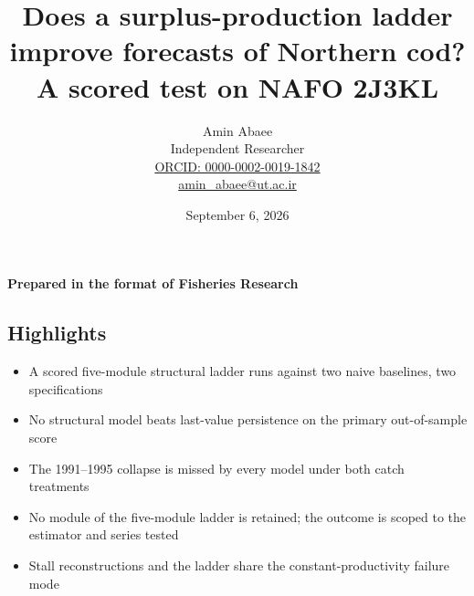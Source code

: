 \documentclass[11pt]{article}
\providecommand{\tightlist}{\setlength{\itemsep}{0pt}\setlength{\parskip}{0pt}}
\begin{document}
\title{Does a surplus-production ladder improve forecasts of Northern cod? A scored test on NAFO 2J3KL}
\author{Amin Abaee\\[0.35em]
{\small Independent Researcher}\\[0.55em]
{\small\href{https://orcid.org/0000-0002-0019-1842}{ORCID: 0000-0002-0019-1842}}\\[0.3em]
{\small\href{mailto:amin\_abaee@ut.ac.ir}{amin\_abaee@ut.ac.ir}}}
\date{September 6, 2026}
\maketitle

{\centering\small \textbf{Prepared in the format of Fisheries Research}\par}

\subsection{Highlights}\label{highlights}

\begin{itemize}
\tightlist
\item
  A scored five-module structural ladder runs against two naive
  baselines, two specifications
\item
  No structural model beats last-value persistence on the primary
  out-of-sample score
\item
  The 1991--1995 collapse is missed by every model under both catch
  treatments
\item
  No module of the five-module ladder is retained; the outcome is scoped
  to the estimator and series tested
\item
  Stall reconstructions and the ladder share the constant-productivity
  failure mode
\end{itemize}
\end{document}

